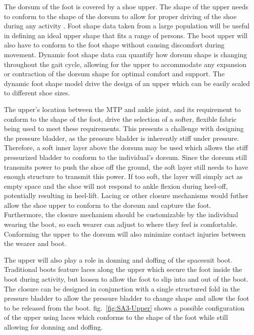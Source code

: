 \documentclass[defaultstyle,11pt]{comps}
\begin{document}
The dorsum of the foot is covered by a shoe upper.
The shape of the upper needs to conform to the shape of the dorsum to allow for proper driving of the shoe during any activity \citep{Feeney2019}.
Foot shape data taken from a large population will be useful in defining an ideal upper shape that fits a range of persons.
The boot upper will also have to conform to the foot shape without causing discomfort during movement.
Dynamic foot shape data can quantify how dorsum shape is changing throughout the gait cycle, allowing for the upper to accommodate any expansion or contraction of the dorsum shape for optimal comfort and support.
The dynamic foot shape model drive the design of an upper which can be easily scaled to different shoe sizes.

The upper's location between the MTP and ankle joint, and its requirement to conform to the shape of the foot, drive the selection of a softer, flexible fabric being used to meet these requirements.
This presents a challenge with designing the pressure bladder, as the pressure bladder is inherently stiff under pressure.
Therefore, a soft inner layer above the dorsum may be used which allows the stiff pressurized bladder to conform to the individual's dorsum.
Since the dorsum still transmits power to push the shoe off the ground, the soft layer still needs to have enough structure to transmit this power.
If too soft, the layer will simply act as empty space and the shoe will not respond to ankle flexion during heel-off, potentially resulting in heel-lift.
Lacing or other closure mechanisms would futher allow the shoe upper to conform to the dorsum and capture the foot.
Furthermore, the closure mechanism should be customizable by the individual wearing the boot, so each wearer can adjust to where they feel is comfortable.
Conforming the upper to the dorsum will also minimize contact injuries between the wearer and boot.

The upper will also play a role in donning and doffing of the spacesuit boot.
Traditional boots feature laces along the upper which secure the foot inside the boot during activity, but loosen to allow the foot to slip into and out of the boot.
The closure can be designed in conjunction with a single structured fold in the pressure bladder to allow the pressure bladder to change shape and allow the foot to be released from the boot.
fig.~\ref{fig:SA3-Upper} shows a possible configuration of the upper using laces which conforms to the shape of the foot while still allowing for donning and doffing.
\end{document}
